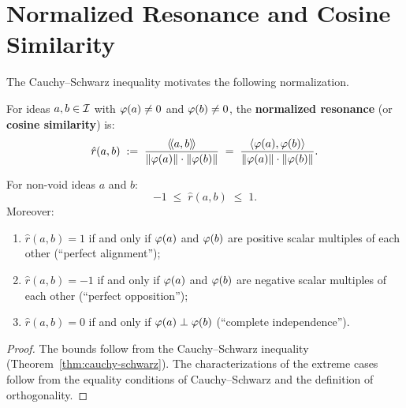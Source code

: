 \section{Normalized Resonance and Cosine Similarity}

The Cauchy--Schwarz inequality motivates the following normalization.

\begin{definition}
\label{def:normalized-resonance}
For ideas $a, b \in \mathcal{I}$ with $\varphi(a) \neq 0$ and $\varphi(b) \neq 0$,
the \textbf{normalized resonance} (or \textbf{cosine similarity}) is:
\[
  \hat{r}(a, b) \;:=\; \frac{\langle\!\langle a, b \rangle\!\rangle}{\lVert \varphi(a) \rVert \cdot \lVert \varphi(b) \rVert}
  \;=\; \frac{\langle \varphi(a), \varphi(b) \rangle}{\lVert \varphi(a) \rVert \cdot \lVert \varphi(b) \rVert}.
\]
\end{definition}

\begin{proposition}
\label{prop:normalized-range}
For non-void ideas $a$ and $b$:
\[
  -1 \;\leq\; \hat{r}(a, b) \;\leq\; 1.
\]
Moreover:
\begin{enumerate}
\item $\hat{r}(a, b) = 1$ if and only if $\varphi(a)$ and $\varphi(b)$ are
positive scalar multiples of each other (``perfect alignment'');
\item $\hat{r}(a, b) = -1$ if and only if $\varphi(a)$ and $\varphi(b)$ are
negative scalar multiples of each other (``perfect opposition'');
\item $\hat{r}(a, b) = 0$ if and only if $\varphi(a) \perp \varphi(b)$
(``complete independence'').
\end{enumerate}
\end{proposition}

\begin{proof}
The bounds follow from the Cauchy--Schwarz inequality (Theorem~\ref{thm:cauchy-schwarz}).
The characterizations of the extreme cases follow from the equality conditions
of Cauchy--Schwarz and the definition of orthogonality.
\end{proof}

